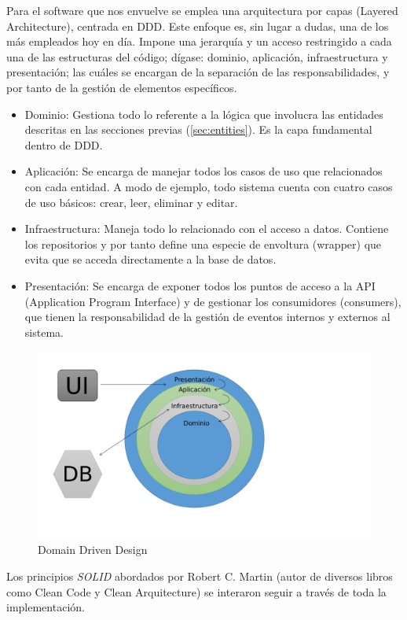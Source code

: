 Para el software que nos envuelve se emplea una arquitectura por capas (Layered Architecture), centrada en DDD. Este enfoque es, sin lugar a dudas, una de los más empleados hoy en día. Impone una jerarquía y un acceso restringido a cada una de las estructuras del código; dígase: dominio, aplicación, infraestructura y presentación; las cuáles se encargan de la separación de las responsabilidades, y por tanto de la gestión de elementos específicos.

\begin{itemize}
	\item Dominio: Gestiona todo lo referente a la lógica que involucra las entidades descritas en las secciones previas (\ref{sec:entities}). Es la capa fundamental dentro de DDD.
	\item Aplicación: Se encarga de manejar todos los casos de uso que relacionados con cada entidad. A modo de ejemplo, todo sistema cuenta con cuatro casos de uso básicos: crear, leer, eliminar y editar.
	\item Infraestructura: Maneja todo lo relacionado con el acceso a datos. Contiene los repositorios y por tanto define una especie de envoltura (wrapper) que evita que se acceda directamente a la base de datos.
	\item Presentación: Se encarga de exponer todos los puntos de acceso a la API (Application Program Interface) y de gestionar  los consumidores (consumers), que tienen la responsabilidad de la gestión de eventos internos y externos al sistema.
\end{itemize}

\begin{figure}[h]
	\centering
	\includegraphics[width=0.75\linewidth]{images/Chapter 3/DDD}
	\caption{Domain Driven Design}
	\label{fig:ddd}
\end{figure}


Los principios \textit{SOLID} \cite{solid_medium} abordados por Robert C. Martin (autor de diversos libros como Clean Code y Clean Arquitecture) se interaron seguir a través de toda la implementación.


